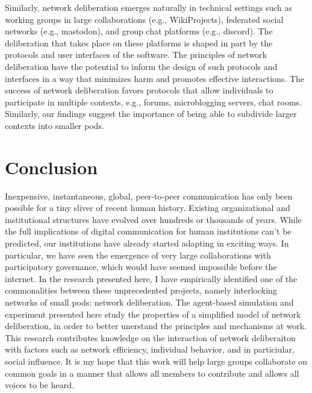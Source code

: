 Similarly, network deliberation emerges naturally in technical settings such as working
groups in large collaborations (e.g., WikiProjects), federated social networks
(e.g., mastodon), and group chat platforms (e.g., discord).
The deliberation that takes place on these platforms is shaped in part by the protocols
and user interfaces of the software.
The principles of network deliberation have the potential to inform the design of such
protocols and interfaces in a way that minimizes harm and promotes effective interactions.
The success of network deliberation favors protocols that allow individuals to participate
in multiple contexts, e.g., forums, microblogging servers, chat rooms.
Similarly, our findings suggest the importance of being able to subdivide larger contexts
into smaller pods.

\section{Conclusion}
Inexpensive, instantaneous, global, peer-to-peer communication has only been possible for a tiny sliver of recent human history.
Existing organizational and institutional structures have evolved over hundreds or thousands of years.
While the full implications of digital communication for human institutions can't be predicted, our institutions have already started adapting in exciting ways.
In particular, we have seen the emergence of very large collaborations with participatory governance, which would have seemed impossible before the internet.
In the research presented here, I have empirically identified one of the commonalities between these unprecedented projects, namely interlocking networks of small pods: network deliberation.
The agent-based simulation and experiment presented here study the properties of a simplified model of network deliberation, in order to better unerstand the principles and mechanisms at work.
This research contributes knowledge on the interaction of network deliberaiton with factors such as network efficiency, individual behavior, and in particiular, social influence.
It is my hope that this work will help large groups collaborate on common goals in a manner that allows all members to contribute and allows all voices to be heard.
